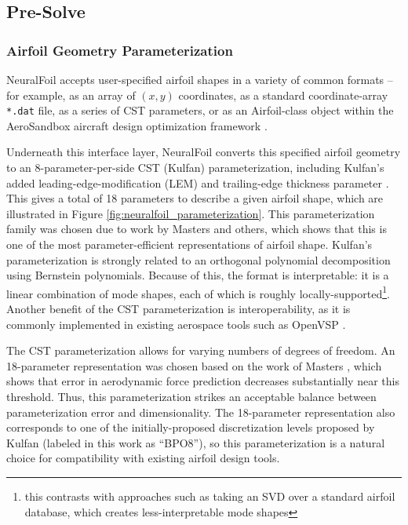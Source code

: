 \documentclass[journal]{new-aiaa}
\begin{document}
\subsection{Pre-Solve}
\label{sec:airfoil-parameterization}

\subsubsection{Airfoil Geometry Parameterization}

NeuralFoil accepts user-specified airfoil shapes in a variety of common formats -- for example, as an array of $(x, y)$ coordinates, as a standard coordinate-array \texttt{*.dat} file, as a series of CST parameters, or as an Airfoil-class object within the AeroSandbox aircraft design optimization framework \cite{sharpeAeroSandboxDifferentiableFramework2021}.

Underneath this interface layer, NeuralFoil converts this specified airfoil geometry to an 8-parameter-per-side CST (Kulfan) parameterization, including Kulfan's added leading-edge-modification (LEM) and trailing-edge thickness parameter \cite{kulfanUniversalParametricGeometry2008,kulfanModificationCSTAirfoil2020}. This gives a total of 18 parameters to describe a given airfoil shape, which are illustrated in Figure \ref{fig:neuralfoil_parameterization}. This parameterization family was chosen due to work by Masters \cite{mastersGeometricComparisonAerofoil2017} and others, which shows that this is one of the most parameter-efficient representations of airfoil shape. Kulfan's parameterization is strongly related to an orthogonal polynomial decomposition using Bernstein polynomials. Because of this, the format is interpretable: it is a linear combination of mode shapes, each of which is roughly locally-supported\footnote{this contrasts with approaches such as taking an SVD over a standard airfoil database, which creates less-interpretable mode shapes}. Another benefit of the CST parameterization is interoperability, as it is commonly implemented in existing aerospace tools such as OpenVSP \cite{mcdonaldOpenVehicleSketch2022}.

The CST parameterization allows for varying numbers of degrees of freedom. An 18-parameter representation was chosen based on the work of Masters \cite{mastersGeometricComparisonAerofoil2017}, which shows that error in aerodynamic force prediction decreases substantially near this threshold. Thus, this parameterization strikes an acceptable balance between parameterization error and dimensionality. The 18-parameter representation also corresponds to one of the initially-proposed discretization levels proposed by Kulfan \cite{kulfanUniversalParametricGeometry2008} (labeled in this work as ``BPO8''), so this parameterization is a natural choice for compatibility with existing airfoil design tools.
\end{document}
